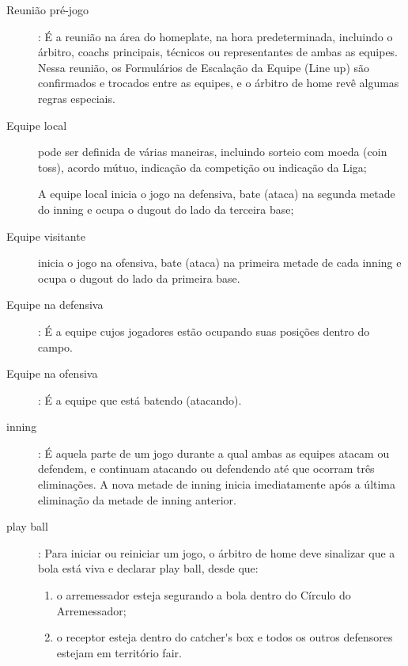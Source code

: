 \begin{description}
\item[Reuni\~ao pr\'e-jogo]: \'E a reuni\~ao na \'area do \gls{homeplate}, na hora predeterminada, incluindo o \'arbitro, \glspl{coach} principais, t\'ecnicos ou representantes de ambas as equipes. Nessa reuni\~ao, os Formul\'arios de Escala\c{c}\~ao da Equipe (Line up) s\~ao confirmados e trocados entre as equipes, e o \'arbitro de \gls{home} rev\^e algumas regras especiais. 


\item[Equipe local] pode ser definida de v\'arias maneiras, incluindo sorteio com moeda (\gls{coin toss}), acordo m\'utuo, indica\c{c}\~ao da competi\c{c}\~ao ou indica\c{c}\~ao da Liga;

A equipe local inicia o jogo na defensiva, bate (ataca) na segunda metade do \gls{inning} e ocupa o \Gls{dugout} do lado da terceira base; 

\item[Equipe visitante] inicia o jogo na ofensiva, bate (ataca) na primeira metade de cada \gls{inning} e ocupa o \Gls{dugout} do lado da primeira base. 

\item[Equipe na defensiva]: \'E a equipe cujos jogadores est\~ao ocupando suas posi\c{c}\~oes dentro do campo. 

\item[Equipe na ofensiva]: \'E a equipe que est\'a batendo (atacando). 

\item[\gls{inning}]: \'E aquela parte de um jogo durante a qual ambas as equipes atacam ou defendem, e continuam atacando ou defendendo at\'e que ocorram tr\^es elimina\c{c}\~oes. A nova metade de \gls{inning} inicia imediatamente após a \'ultima elimina\c{c}\~ao da metade de \gls{inning} anterior. 

\item[\Gls{play ball}]: Para iniciar ou reiniciar um jogo, o \'arbitro de \gls{home} deve sinalizar que a bola est\'a viva e declarar \gls{play ball}, desde que: 

\begin{enumerate}[label=\alph*)]
	\item o arremessador esteja segurando a bola dentro do C\'irculo do Arremessador; 

	\item  o receptor esteja dentro do \gls{catcher's box} e todos os outros defensores estejam 
em território \gls{fair}. 
\end{enumerate}


\end{description}
